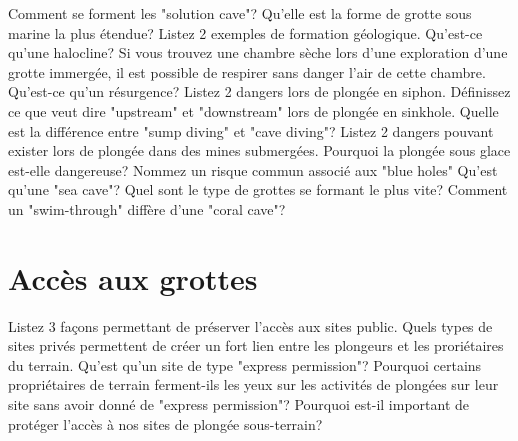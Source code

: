 \documentclass[english,1pt,a4paper]{article}
\begin{document}
	\begin{outline}
		\1 Comment se forment les "solution cave"?	\vspace{2cm}
		\1 Qu'elle est la forme de grotte sous marine la plus étendue?	\vspace{2cm}
		\1 Listez 2 exemples de formation géologique.	\vspace{2cm}
		\1 Qu’est-ce qu’une halocline?	\vspace{2cm}
		\1 Si vous trouvez une chambre sèche lors d’une exploration d’une grotte immergée, il est possible de respirer sans danger l’air de cette chambre.	\vspace{2cm}
		\1 Qu’est-ce qu’un résurgence?	\vspace{2cm}
		\1 Listez 2 dangers lors de plongée en siphon.	\vspace{2cm}
		\1 Définissez ce que veut dire "upstream" et "downstream" lors de plongée en sinkhole.	\vspace{2cm}
		\1 Quelle est la différence entre "sump diving" et "cave diving"?	\vspace{2cm}
		\1 Listez 2 dangers pouvant exister lors de plongée dans des mines submergées.	\vspace{2cm}
		\1 Pourquoi la plongée sous glace est-elle dangereuse?	\vspace{2cm}
		\1 Nommez un risque commun associé aux "blue holes"	\vspace{2cm}
		\1 Qu’est qu’une "sea cave"?	\vspace{2cm}
		\1 Quel sont le type de grottes se formant le plus vite?	\vspace{2cm}
		\1 Comment un "swim-through" diffère d’une "coral cave"?	\vspace{2cm}
	\end{outline}
	\pagebreak	

	\section{Accès aux grottes}

	\begin{outline}
		\1 Listez 3 façons permettant de préserver l’accès aux sites public.	\vspace{2cm}
		\1 Quels types de sites privés permettent de créer un fort lien entre les plongeurs et les proriétaires du terrain.	\vspace{2cm}
		\1 Qu’est qu’un site de type "express permission"?	\vspace{2cm}
		\1 Pourquoi certains propriétaires de terrain ferment-ils les yeux sur les activités de plongées sur leur site sans avoir donné de "express permission"?	\vspace{2cm}
		\1 Pourquoi est-il important de protéger l’accès à nos sites de plongée sous-terrain?	\vspace{2cm}
	\end{outline}
	\pagebreak	
\end{document}
